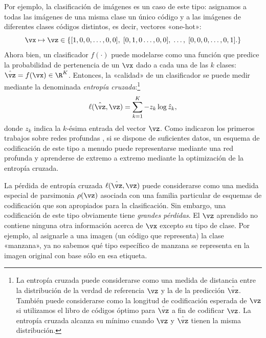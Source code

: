 \documentclass[../../book-main_es.tex]{subfiles}
\begin{document}
\begin{example}\label{example:image_classification_feature_learning}
    Por ejemplo, la clasificación de imágenes es un caso de este tipo: asignamos a todas
    las imágenes de una misma clase un único código y a las imágenes de diferentes
    clases códigos distintos, es decir, vectores «one-hot»:
    \begin{equation}
        \vx \mapsto \vz \in \{  [1, 0, 0, \ldots , 0, 0], \;  [0, 1,
        0 \ldots, 0, 0], \; \ldots, \;  [0,0,0, \ldots, 0, 1].\}
        \label{eqn:class-labels}
    \end{equation}
    Ahora bien, un clasificador \(f(\cdot)\) puede modelarse como una función que
    predice la probabilidad de pertenencia de un \(\vx\) dado a cada una de
    las \(k\) clases: \(\hat{\vz} = f(\vx) \in \R^{K}\). Entonces, la
    «calidad» de un clasificador se puede medir mediante la denominada
    {\em entropía cruzada}:\footnote{La entropía cruzada puede considerarse como
        una medida de distancia entre la distribución de la verdad de referencia
        \(\vz\) y la de la predicción \(\hat{\vz}\). También puede
        considerarse como la longitud de codificación esperada de \(\vz\) si utilizamos el
        libro de códigos óptimo para \(\hat{\vz}\) a fin de codificar \(\vz\). La entropía cruzada
        alcanza su mínimo cuando \(\vz\) y \(\hat{\vz}\) tienen
    la misma distribución.}
    \begin{equation}
        \ell(\hat{\vz}, \vz) = \sum_{k=1}^{K} - z_{k} \log \hat{z}_{k},
    \end{equation}
    donde \(z_{k}\) indica la \(k\)-ésima entrada del vector
    \(\vz\). Como indicaron los primeros trabajos sobre redes profundas
    \cite{krizhevsky2012imagenet}, si se dispone de suficientes datos, un
    esquema de codificación de este tipo a menudo puede representarse mediante una red profunda y
    aprenderse de extremo a extremo mediante la optimización de la entropía cruzada.
\end{example}

La pérdida de entropía cruzada \(\ell(\hat{\vz}, \vz)\) puede considerarse como una
medida especial de parsimonia \(\rho(\vz)\) asociada con una
familia particular de esquemas de codificación que son apropiados
para la clasificación. Sin embargo, una codificación de este tipo
obviamente tiene \textit{grandes pérdidas}. El \(\vz\) aprendido
no contiene ninguna otra información acerca de \(\vx\) excepto su
tipo de clase. Por ejemplo, al asignarle a una imagen (un código que 
representa) la clase «manzana», ya no sabemos qué tipo específico
de manzana se representa en la imagen original con base sólo en esa
etiqueta.
\end{document}
